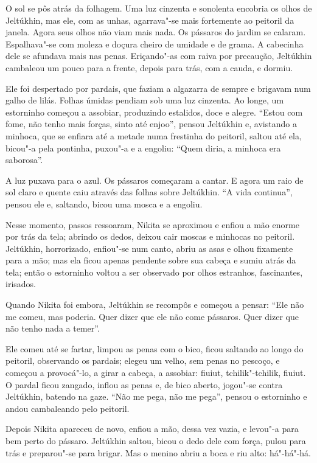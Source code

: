 O sol se pôs atrás da folhagem. Uma luz cinzenta e sonolenta encobria os
olhos de Jeltúkhin, mas ele, com as unhas, agarrava"-se mais fortemente ao
peitoril da janela. Agora seus olhos não viam mais nada. Os pássaros do
jardim se calaram. Espalhava"-se com moleza e doçura cheiro de umidade e
de grama. A cabecinha dele se afundava mais nas penas. Eriçando"-as com
raiva por precaução, Jeltúkhin cambaleou um pouco para a frente, depois
para trás, com a cauda, e dormiu.

Ele foi despertado por pardais, que faziam a algazarra de sempre e
brigavam num galho de lilás. Folhas úmidas pendiam sob uma luz cinzenta.
Ao longe, um estorninho começou a assobiar, produzindo estalidos, doce e
alegre. ``Estou com fome, não tenho mais forças, sinto até enjoo'',
pensou Jeltúkhin e, avistando a minhoca, que se enfiara até a metade
numa frestinha do peitoril, saltou até ela, bicou"-a pela pontinha,
puxou"-a e a engoliu: ``Quem diria, a minhoca era saborosa''.

A luz puxava para o azul. Os pássaros começaram a cantar. E agora um
raio de sol claro e quente caiu através das folhas sobre Jeltúkhin. ``A
vida continua'', pensou ele e, saltando, bicou uma mosca e a engoliu.

Nesse momento, passos ressoaram, Nikita se aproximou e enfiou a mão
enorme por trás da tela; abrindo os dedos, deixou cair moscas e
minhocas no peitoril. Jeltúkhin, horrorizado, enfiou"-se num canto, abriu
as asas e olhou fixamente para a mão; mas ela ficou apenas pendente
sobre sua cabeça e sumiu atrás da tela; então o estorninho voltou a ser
observado por olhos estranhos, fascinantes, irisados.

Quando Nikita foi embora, Jeltúkhin se recompôs e começou a pensar:
``Ele não me comeu, mas poderia. Quer dizer que ele não come pássaros.
Quer dizer que não tenho nada a temer''.

Ele comeu até se fartar, limpou as penas com o bico, ficou saltando ao
longo do peitoril, observando os pardais; elegeu um velho, sem penas no
pescoço, e começou a provocá"-lo, a girar a cabeça, a assobiar: fiuiut,
tchilik"-tchilik, fiuiut. O pardal ficou zangado, inflou as penas e, de
bico aberto, jogou"-se contra Jeltúkhin, batendo na gaze. ``Não me pega,
não me pega'', pensou o estorninho e andou cambaleando pelo peitoril.

Depois Nikita apareceu de novo, enfiou a mão, dessa vez vazia, e levou"-a
para bem perto do pássaro. Jeltúkhin saltou, bicou o dedo dele com
força, pulou para trás e preparou"-se para brigar. Mas o menino
abriu a boca e riu alto: há"-há"-há.

